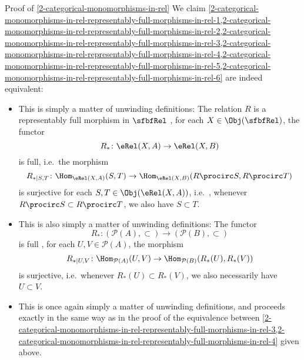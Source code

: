 \begin{Proof}{Proof of \cref{2-categorical-monomorphisms-in-rel}}
    We claim \cref{2-categorical-monomorphisms-in-rel-representably-full-morphisms-in-rel-1,2-categorical-monomorphisms-in-rel-representably-full-morphisms-in-rel-2,2-categorical-monomorphisms-in-rel-representably-full-morphisms-in-rel-3,2-categorical-monomorphisms-in-rel-representably-full-morphisms-in-rel-4,2-categorical-monomorphisms-in-rel-representably-full-morphisms-in-rel-5,2-categorical-monomorphisms-in-rel-representably-full-morphisms-in-rel-6} are indeed equivalent:
    \begin{itemize}
        \item{}This is simply a matter of unwinding definitions: The relation $R$ is a representably full morphism in $\sfbfRel$ \textiff, for each $X\in\Obj(\sfbfRel)$, the functor
            \[
                R_{*}%
                \colon%
                \eRel(X,A)%
                \to%
                \eRel(X,B)%
            \]%
            is full, i.e.\ \textiff the morphism
            \[
                R_{*|S,T}%
                \colon%
                \Hom_{\eRel(X,A)}(S,T)%
                \to%
                \Hom_{\eRel(X,B)}(R\procirc S,R\procirc T)%
            \]%
            is surjective for each $S,T\in\Obj(\eRel(X,A))$, i.e.\ \textiff, whenever $R\procirc S\subset R\procirc T$, we also have $S\subset T$.
        \item{}This is also simply a matter of unwinding definitions: The functor
            \[
                R_{*}%
                \colon%
                (\mathcal{P}(A),\subset)%
                \to%
                (\mathcal{P}(B),\subset)%
            \]%
            is full \textiff, for each $U,V\in\mathcal{P}(A)$, the morphism
            \[
                R_{*|U,V}%
                \colon%
                \Hom_{\mathcal{P}(A)}(U,V)%
                \to%
                \Hom_{\mathcal{P}(B)}(R_{*}(U),R_{*}(V))%
            \]%
            is surjective, i.e.\ \textiff whenever $R_{*}(U)\subset R_{*}(V)$, we also necessarily have $U\subset V$.
        \item{}This is once again simply a matter of unwinding definitions, and proceeds exactly in the same way as in the proof of the equivalence between \cref{2-categorical-monomorphisms-in-rel-representably-full-morphisms-in-rel-3,2-categorical-monomorphisms-in-rel-representably-full-morphisms-in-rel-4} given above.

\end{itemize}
\end{Proof}
